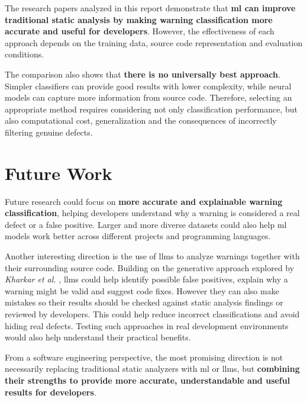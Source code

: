 \hspace{0.6em} The research papers analyzed in this report demonstrate that \textbf{\gls{ml} can improve traditional static analysis by making warning classification more accurate and useful for developers}. However, the effectiveness of each approach depends on the training data, source code representation and evaluation conditions.

\hspace{0.6em} The comparison also shows that \textbf{there is no universally best approach}. Simpler classifiers can provide good results with lower complexity, while neural models can capture more information from source code. Therefore, selecting an appropriate method requires considering not only classification performance, but also computational cost, generalization and the consequences of incorrectly filtering genuine defects.



\section{Future Work} \label{sec:futurework}

\hspace{0.6em} Future research could focus on \textbf{more accurate and explainable warning classification}, helping developers understand why a warning is considered a real defect or a false positive. Larger and more diverse datasets could also help \gls{ml} models work better across different projects and programming languages.

\hspace{0.6em} Another interesting direction is the use of \gls{llms} to analyze warnings together with their surrounding source code. Building on the generative approach explored by \textit{Kharkar et al.} \cite{paper1_kharkarlearning2022}, \gls{llms} could help identify possible false positives, explain why a warning might be valid and suggest code fixes. However they can also make mistakes so their results should be checked against static analysis findings or reviewed by developers. This could help reduce incorrect classifications and avoid hiding real defects. Testing such approaches in real development environments would also help understand their practical benefits.

\hspace{0.6em} From a software engineering perspective, the most promising direction is not necessarily replacing traditional static analyzers with \gls{ml} or \gls{llms}, but \textbf{combining their strengths to provide more accurate, understandable and useful results for developers}.


